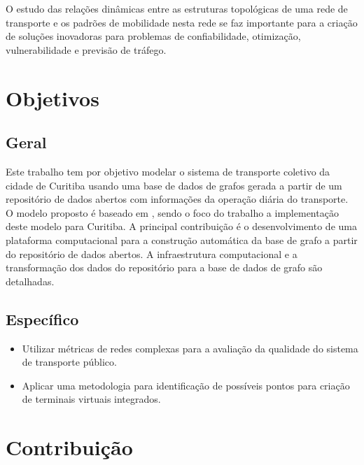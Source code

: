 \textcolor{courb2020}{
O estudo das relações dinâmicas entre as estruturas topológicas de uma rede de transporte e os padrões de mobilidade nesta rede se faz importante para a criação de soluções inovadoras para problemas de confiabilidade, otimização, vulnerabilidade e previsão de tráfego. 
}


\section{Objetivos}
 
\subsection{Geral}


\textcolor{courb2020}{
Este trabalho tem por objetivo modelar o sistema de transporte coletivo da cidade de Curitiba usando uma base de dados de grafos gerada a partir de um repositório de dados abertos com informações da operação diária do transporte. O modelo proposto é baseado em \cite{wach:19}, sendo o foco do trabalho a implementação deste modelo para Curitiba. A principal contribuição é o desenvolvimento de uma plataforma computacional para a construção automática da base de grafo a partir do repositório de dados abertos. A infraestrutura computacional e a transformação dos dados do repositório para a base de dados de grafo são detalhadas. 
}

 \subsection{Específico}
 
 \begin{itemize}
 \item Utilizar métricas de redes complexas para a avaliação da qualidade do sistema de transporte público.
 
 \item Aplicar uma metodologia para identificação de possíveis pontos para criação de terminais virtuais integrados.
 \end{itemize}
 
 
 
\section{Contribuição}
\label{sec:contrib}

